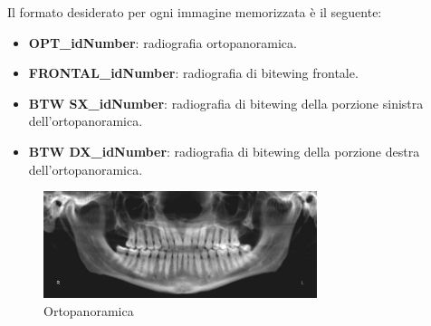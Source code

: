 \documentclass[12pt,a4paper,openright,twoside]{book}
\begin{document}
Il formato desiderato per ogni immagine memorizzata è il seguente:
\begin{itemize}
\item \textbf{OPT\_idNumber}: radiografia ortopanoramica.
\item \textbf{FRONTAL\_idNumber}: radiografia di bitewing frontale.
\item \textbf{BTW SX\_idNumber}: radiografia di bitewing della porzione sinistra dell'ortopanoramica.
\item \textbf{BTW DX\_idNumber}: radiografia di bitewing della porzione destra dell'ortopanoramica.
\end{itemize}

\begin{figure}[H]
    \centering
    \includegraphics[width=8cm]{figures/opt.pdf}
    \caption{Ortopanoramica}
    \label{fig:opt}
\end{figure}
\end{document}
